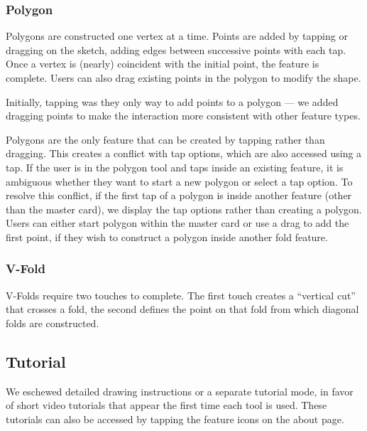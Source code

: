 \subsubsection{Polygon}\label{polygon}

Polygons are constructed one vertex at a time. Points are added by
tapping or dragging on the sketch, adding edges between successive
points with each tap. Once a vertex is (nearly) coincident with the
initial point, the feature is complete. Users can also drag existing
points in the polygon to modify the shape.

Initially, tapping was they only way to add points to a polygon --- we
added dragging points to make the interaction more consistent with other
feature types.

Polygons are the only feature that can be created by tapping rather than
dragging. This creates a conflict with tap options, which are also
accessed using a tap. If the user is in the polygon tool and taps inside
an existing feature, it is ambiguous whether they want to start a new
polygon or select a tap option. To resolve this conflict, if the first
tap of a polygon is inside another feature (other than the master card),
we display the tap options rather than creating a polygon. Users can
either start polygon within the master card or use a drag to add the
first point, if they wish to construct a polygon inside another fold
feature.

\subsubsection{V-Fold}\label{v-fold}

V-Folds require two touches to complete. The first touch creates a
``vertical cut'' that crosses a fold, the second defines the point on
that fold from which diagonal folds are constructed.

\subsection{Tutorial}\label{tutorial}

We eschewed detailed drawing instructions or a separate tutorial mode,
in favor of short video tutorials that appear the first time each tool
is used. These tutorials can also be accessed by tapping the feature
icons on the about page.

